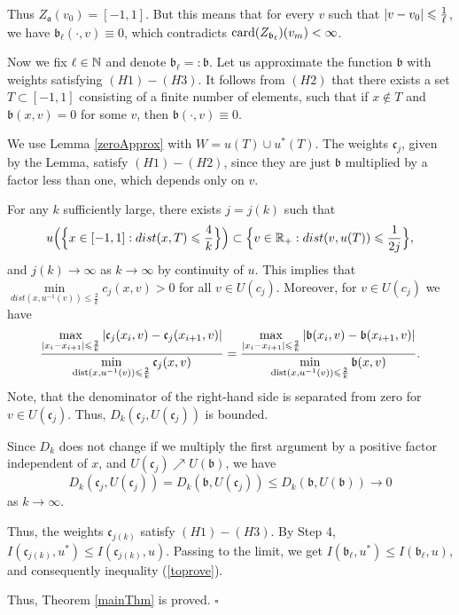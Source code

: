 Thus $Z_{\mathfrak a}(v_0) = [-1, 1]$.
But this means that for every $v$ such that $\abs{v - v_0} \le \frac{1}{\ell}$,
we have $\mathfrak b_{\ell}(\cdot, v) \equiv 0$,
which contradicts ${\rm card}(Z_{\mathfrak b_{\ell}})(v_m) < \infty$.

Now we fix $\ell \in \mathbb N$ and denote $\mathfrak b_{\ell} =: \mathfrak b$.
Let us approximate the function $\mathfrak b$ with weights satisfying $(H1)-(H3)$.
It follows from $(H2)$ that there exists a set $T \subset [-1, 1]$
consisting of a finite number of elements, such that
if $x \not\in T$ and $\mathfrak b(x, v) = 0$ for some $v$, then $\mathfrak b(\cdot, v) \equiv 0$.

We use Lemma \ref{zeroApprox} with $W = u(T) \cup u^*(T)$.
The weights $\mathfrak c_j$, given by the Lemma, satisfy $(H1)-(H2)$,
since they are just $\mathfrak b$ multiplied by a factor less than one, which depends only on $v$.

For any $k$ sufficiently large, there exists $j = j(k)$ such that
$$u\Big( \Big\{ x \in [-1, 1]: dist(x, T) \le \frac{4}{k} \Big\} \Big) \subset \Big\{ v \in \Real_+: dist(v, u(T)) \le \frac{1}{2j} \Big\},$$
and $j(k) \to \infty$ as $k \to \infty$ by continuity of $u$.
This implies that $\min\limits_{dist(x, u^{-1}(v)) \le \frac{2}{k}} c_j(x, v) > 0$
for all $v \in U(c_j)$.
Moreover, for $v \in U(c_j)$ we have
$$
\frac{\max\limits_{\abs{x_i - x_{i + 1}} \le \frac{2}{k}} \abs{\mathfrak c_j(x_i, v) - \mathfrak c_j(x_{i + 1}, v)}}
{\min\limits_{\dist(x, u^{-1}(v)) \le \frac{2}{k}} \mathfrak c_j(x, v)}
=\frac{\max\limits_{\abs{x_i - x_{i + 1}} \le \frac{2}{k}} \abs{\mathfrak b(x_i, v) - \mathfrak b(x_{i + 1}, v)}}
{\min\limits_{\dist(x, u^{-1}(v)) \le \frac{2}{k}} \mathfrak b(x, v)}.
$$
Note, that the denominator of the right-hand side is separated from zero for $v \in U(\mathfrak c_j)$.
Thus, $D_k(\mathfrak c_j, U(\mathfrak c_j))$ is bounded.

Since $D_k$ does not change if we multiply the first argument by a positive factor independent of $x$,
and $U(\mathfrak c_j) \nearrow U(\mathfrak b)$, we have
$$D_k(\mathfrak c_j, U(\mathfrak c_j)) = D_k(\mathfrak b, U(\mathfrak c_j)) \le D_k(\mathfrak b, U(\mathfrak b)) \to 0$$
as $k \to \infty$.

Thus, the weights $\mathfrak c_{j(k)}$ satisfy $(H1)-(H3)$.
By Step 4, $I(\mathfrak c_{j(k)}, u^*) \le I(\mathfrak c_{j(k)}, u)$.
Passing to the limit, we get $I(\mathfrak b_{\ell}, u^*) \le I(\mathfrak b_{\ell}, u)$,
and consequently inequality (\ref{toprove}).

Thus, Theorem \ref{mainThm} is proved.
\hfill $\square$

